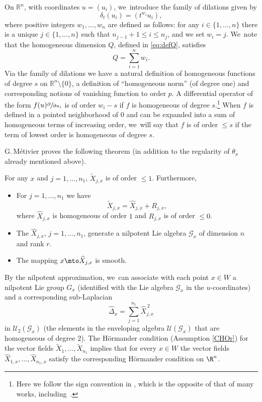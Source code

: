 On $\mathbb R^n$, with coordinates $u=(u_{i})$, we~introduce the family of dilations given by
\begin{equation}
\label{eq:dilation}
\delta_t (u_{i}) = (t^{w_i} u_{i}),
\end{equation}
where positive integers $w_1,\ldots,w_n$ are defined as follows: for any $i\in\{1,\ldots,n\}$ there is a unique $j\in\{1,\ldots,n\}$ such that $n_{j-1}+1 \leq i\leq n_j$, and we set $w_i=j$. We~note that the homogeneous dimension $Q$, defined in \eqref{eq:defQ}, satisfies
\begin{equation}\label{eq:defQa}
Q =\sum_{i=1}^n w_i.
\end{equation}
Via the family of dilations we have a natural definition of homogeneous functions of degree $s$ on $\mathbb R^n\setminus\{0\}$, a definition of ``homogeneous norm'' (of degree one) and corresponding notions of vanishing function to order $p$.
A differential operator of the form
$f(u) \sfrac{\partial}{\partial u_{i}}$ is of order $w_i -s$ if $f$ is homogeneous of degree $s$.\footnote{Here we follow the sign convention in \cite{Me}, which is the opposite of that of many works, including~\cite{Je}.} When $f$ is defined in a pointed neighborhood of $0$ and can be expanded into a sum of homogeneous terms of increasing order, we~will say that $f$ is of order $\leq s$ if the term of lowest order is homogeneous of degree $s$.

G.\,Métivier \cite[Th.\,3.1]{Me} proves the following theorem (in addition to the regularity of $\theta_x$ already mentioned above).

\begin{theorem}\label{lemmaMet}
For any $x$ and $j=1,\ldots,n_1$, $\tilde X_{j,x}$ is of order $\leq 1$. Furthermore,
\begin{itemize}
\item For $j=1,\ldots,n_1$ we have
\[
\tilde X_{j,x} = \widehat X_{j,x} + R_{j,x},
\]
where $\widehat X_{j,x}$ is homogeneous of order $1$ and $R_{j,x}$ is of order $\leq 0$.
\item
The $\widehat X_{j,x}$, $j=1,\ldots,n_1$, generate a nilpotent Lie algebra $\mathcal G_x$ of dimension $n$ and rank $r$.
\item
The mapping $x \mto \widehat X_{j,x}$ is smooth.
\end{itemize}
\end{theorem}

By the nilpotent approximation, we~can associate with each point $x\in W$ a nilpotent Lie group $G_x$ (identified with the Lie algebra $\mathcal G_x$ in the $u$-coordinates) and a corresponding sub-Laplacian
\[
\widehat \Delta_x= \sum_{j=1}^{n_1} \widehat X_{j,x}^{\,2}
\]
in $\mathcal U_2(\mathcal G_x)$ (the elements in the enveloping algebra $\mathcal U(\mathcal G_x)$ that are homogeneous of degree $2$). The Hörmander condition (Assumption \ref{CHOr}) for the vector fields $\tilde X_1,\ldots,\tilde X_{n_1}$ implies that for every $x\in W$ the vector fields $\widehat X_{1,x},\ldots,\widehat X_{n_1,x}$ satisfy the corresponding Hörmander condition on $\R^n$.

